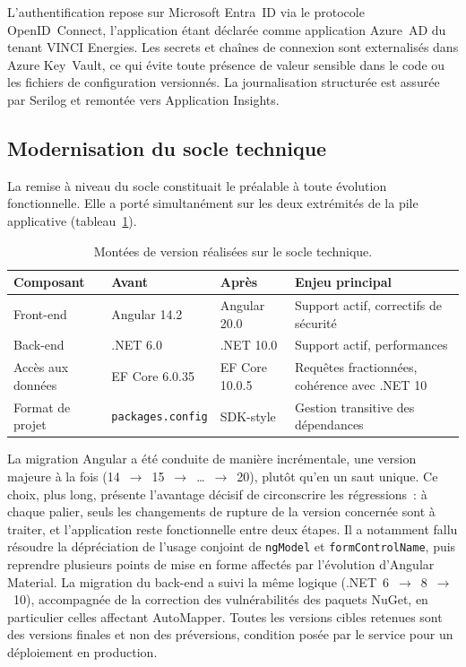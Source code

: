 L'authentification repose sur Microsoft Entra~ID via le protocole
OpenID~Connect, l'application étant déclarée comme application
Azure~AD du tenant VINCI Energies. Les secrets et chaînes de connexion sont
externalisés dans Azure Key~Vault, ce qui évite toute
présence de valeur sensible dans le code ou les fichiers de configuration
versionnés. La journalisation structurée est assurée par Serilog et remontée
vers Application Insights.

\subsection{Modernisation du socle technique}
\label{sec:socle}

La remise à niveau du socle constituait le préalable à toute évolution
fonctionnelle. Elle a porté simultanément sur les deux extrémités de la pile
applicative (tableau~\ref{tab:versions}).

\begin{table}[H]
  \centering
  \caption{Montées de version réalisées sur le socle technique.}
  \label{tab:versions}
  \small
  \begin{tabularx}{\textwidth}{@{}lllX@{}}
    \toprule
    \textbf{Composant} & \textbf{Avant} & \textbf{Après} & \textbf{Enjeu principal} \\
    \midrule
    Front-end        & Angular 14.2 & Angular 20.0 & Support actif, correctifs de sécurité \\
    Back-end         & .NET 6.0     & .NET 10.0    & Support actif, performances \\
    Accès aux données& EF Core 6.0.35 & EF Core 10.0.5 & Requêtes fractionnées, cohérence avec .NET 10 \\
    Format de projet & \texttt{packages.config} & SDK-style & Gestion transitive des dépendances \\
    \bottomrule
  \end{tabularx}
\end{table}

La migration Angular a été conduite de manière incrémentale, une
version majeure à la fois (14~$\rightarrow$~15~$\rightarrow$~\dots~$\rightarrow$~20),
plutôt qu'en un saut unique. Ce choix, plus long, présente l'avantage décisif de
circonscrire les régressions~: à chaque palier, seuls les changements de rupture
de la version concernée sont à traiter, et l'application reste fonctionnelle
entre deux étapes. Il a notamment fallu résoudre la dépréciation de l'usage
conjoint de \texttt{ngModel} et \texttt{formControlName}, puis reprendre
plusieurs points de mise en forme affectés par l'évolution d'Angular Material.
La migration du back-end a suivi la même logique (.NET~6~$\rightarrow$~8~$\rightarrow$~10),
accompagnée de la correction des vulnérabilités des paquets NuGet, en
particulier celles affectant AutoMapper. Toutes les versions cibles retenues
sont des versions finales et non des préversions, condition posée par le service
pour un déploiement en production.

